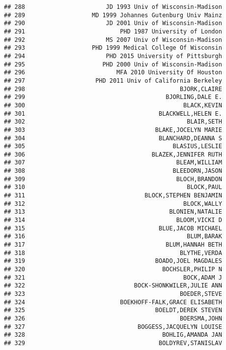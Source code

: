 \documentclass[
]{article}
\begin{document}
\begin{verbatim}
## 288                       JD 1993 Univ of Wisconsin-Madison
## 289                   MD 1999 Johannes Gutenburg Univ Mainz
## 290                       JD 2001 Univ of Wisconsin-Madison
## 291                           PHD 1987 University of London
## 292                       MS 2007 Univ of Wisconsin-Madison
## 293                   PHD 1999 Medical College Of Wisconsin
## 294                       PHD 2015 University of Pittsburgh
## 295                      PHD 2000 Univ of Wisconsin-Madison
## 296                          MFA 2010 University Of Houston
## 297                    PHD 2011 Univ of California Berkeley
## 298                                            BJORK,CLAIRE
## 299                                        BJORLING,DALE E.
## 300                                             BLACK,KEVIN
## 301                                      BLACKWELL,HELEN E.
## 302                                              BLAIR,SETH
## 303                                     BLAKE,JOCELYN MARIE
## 304                                      BLANCHARD,DEANNA S
## 305                                          BLASIUS,LESLIE
## 306                                    BLAZEK,JENNIFER RUTH
## 307                                           BLEAM,WILLIAM
## 308                                          BLEEDORN,JASON
## 309                                           BLOCH,BRANDON
## 310                                              BLOCK,PAUL
## 311                                  BLOCK,STEPHEN BENJAMIN
## 312                                             BLOCK,WALLY
## 313                                         BLONIEN,NATALIE
## 314                                           BLOOM,VICKI D
## 315                                      BLUE,JACOB MICHAEL
## 316                                              BLUM,BARAK
## 317                                        BLUM,HANNAH BETH
## 318                                            BLYTHE,VERDA
## 319                                     BOADO,JOEL MAGDALES
## 320                                       BOCHSLER,PHILIP N
## 321                                             BOCK,ADAM J
## 322                               BOCK-SHONKWILER,JULIE ANN
## 323                                            BOEDER,STEVE
## 324                           BOEKHOFF-FALK,GRACE ELISABETH
## 325                                     BOELDT,DEREK STEVEN
## 326                                            BOERSMA,JOHN
## 327                                BOGGESS,JACQUELYN LOUISE
## 328                                       BOHLIG,AMANDA JAN
## 329                                      BOLDYREV,STANISLAV

\end{verbatim}
\end{document}

